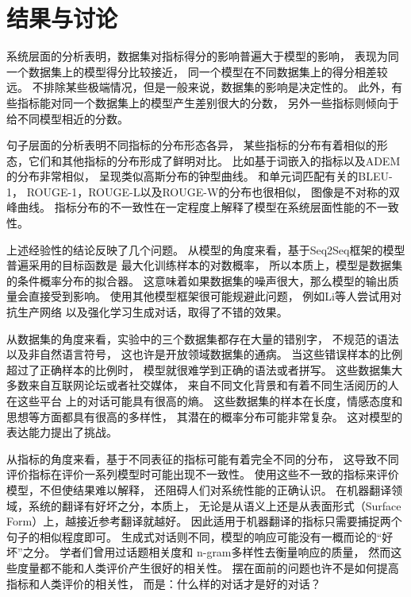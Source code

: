 \section{结果与讨论}\label{sec:result_and_discussion}
系统层面的分析表明，数据集对指标得分的影响普遍大于模型的影响，
表现为同一个数据集上的模型得分比较接近，
同一个模型在不同数据集上的得分相差较远。
不排除某些极端情况，但是一般来说，数据集的影响是决定性的。
此外，有些指标能对同一个数据集上的模型产生差别很大的分数，
另外一些指标则倾向于给不同模型相近的分数。

句子层面的分析表明不同指标的分布形态各异，
某些指标的分布有着相似的形态，它们和其他指标的分布形成了鲜明对比。
比如基于词嵌入的指标以及ADEM的分布非常相似，
呈现类似高斯分布的钟型曲线。
和单元词匹配有关的BLEU-1，
ROUGE-1，ROUGE-L以及ROUGE-W的分布也很相似，
图像是不对称的双峰曲线。
指标分布的不一致性在一定程度上解释了模型在系统层面性能的不一致性。

上述经验性的结论反映了几个问题。
从模型的角度来看，基于Seq2Seq框架的模型普遍采用的目标函数是
最大化训练样本的对数概率，
所以本质上，模型是数据集的条件概率分布的拟合器。
这意味着如果数据集的噪声很大，那么模型的输出质量会直接受到影响。
使用其他模型框架很可能规避此问题，
例如Li等人尝试用对抗生产网络
以及强化学习生成对话，取得了不错的效果。

从数据集的角度来看，实验中的三个数据集都存在大量的错别字，
不规范的语法以及非自然语言符号，
这也许是开放领域数据集的通病。
当这些错误样本的比例超过了正确样本的比例时，
模型就很难学到正确的语法或者拼写。
这些数据集大多数来自互联网论坛或者社交媒体，
来自不同文化背景和有着不同生活阅历的人在这些平台
上的对话可能具有很高的熵。
这些数据集的样本在长度，情感态度和思想等方面都具有很高的多样性，
其潜在的概率分布可能非常复杂。
这对模型的表达能力提出了挑战。

从指标的角度来看，基于不同表征的指标可能有着完全不同的分布，
这导致不同评价指标在评价一系列模型时可能出现不一致性。
使用这些不一致的指标来评价模型，不但使结果难以解释，
还阻碍人们对系统性能的正确认识。
在机器翻译领域，系统的翻译有好坏之分，本质上，
无论是从语义上还是从表面形式（Surface Form）上，越接近参考翻译就越好。
因此适用于机器翻译的指标只需要捕捉两个句子的相似程度即可。
生成式对话则不同，模型的响应可能没有一概而论的“好坏”之分。
学者们曾用过话题相关度和
n-gram多样性去衡量响应的质量，
然而这些度量都不能和人类评价产生很好的相关性。
摆在面前的问题也许不是如何提高指标和人类评价的相关性，
而是：什么样的对话才是好的对话？
